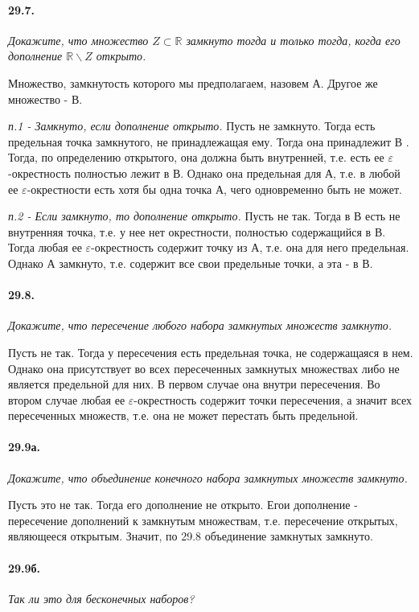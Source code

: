 \documentclass{book}
\begin{document}
\paragraph{29.7.}
\textit{Докажите, что множество $Z \subset \mathbb{R}$ замкнуто тогда и только тогда, когда его дополнение $\mathbb{R} \backslash Z$ открыто.}

Множество, замкнутость которого мы предполагаем, назовем А. Другое же множество - В.

\textit{п.1 - Замкнуто, если дополнение открыто.} Пусть не замкнуто. Тогда есть предельная точка замкнутого, не принадлежащая ему. Тогда она принадлежит В . Тогда, по определению открытого, она должна быть внутренней, т.е. есть ее $\varepsilon$-окрестность полностью лежит в В. Однако она предельная для А, т.е. в любой ее $\varepsilon$-окрестности есть хотя бы одна точка А, чего одновременно быть не может.

\textit{п.2 - Если замкнуто, то дополнение открыто.} Пусть не так. Тогда в В есть не внутренняя точка, т.е. у нее нет окрестности, полностью содержащийся в В. Тогда любая ее $\varepsilon$-окрестность содержит точку из А, т.е. она для него предельная. Однако А замкнуто, т.е. содержит все свои предельные точки, а эта - в В.

\paragraph{29.8.}
\textit{Докажите, что пересечение любого набора замкнутых множеств замкнуто.}

Пусть не так. Тогда у пересечения есть предельная точка, не содержащаяся в нем. Однако она присутствует во всех пересеченных замкнутых множествах либо не является предельной для них. В первом случае она внутри пересечения. Во втором случае любая ее $\varepsilon$-окрестность содержит точки пересечения, а значит всех пересеченных множеств, т.е. она не может перестать быть предельной.

\paragraph{29.9а.}
\textit{Докажите, что объединение конечного набора замкнутых множеств замкнуто.}

Пусть это не так. Тогда его дополнение не открыто. Егои дополнение - пересечение дополнений к замкнутым множествам, т.е. пересечение открытых, являющееся открытым. Значит, по 29.8 объединение замкнутых замкнуто.

\paragraph{29.9б.}
\textit{Так ли это для бесконечных наборов?}
\end{document}
